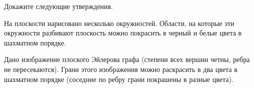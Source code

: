 Докажите следующие утверждения.
\begin{enumcyr}
   	\item На плоскости нарисовано несколько окружностей. Области, на которые эти окружности разбивают
        плоскость можно покрасить в черный и белые цвета в шахматном порядке.
    \item Дано изображение плоского Эйлерова графа (степени всех вершин четны, ребра не
        пересекаются). Грани этого изображения можно раскрасить в два цвета в шахматном порядке (соседние
        по ребру грани покрашены в разные цвета).
\end{enumcyr}